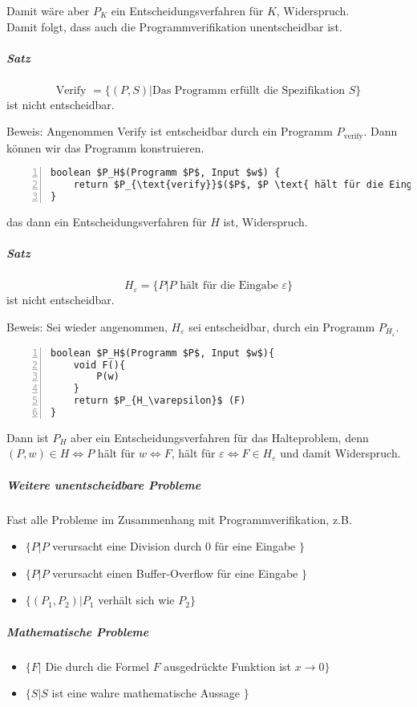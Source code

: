 \documentclass[a4paper]{scrartcl}
\begin{document}
Damit wäre aber $P_K$ ein Entscheidungsverfahren für $K$, Widerspruch.\\
Damit folgt, dass auch die Programmverifikation unentscheidbar ist.

\subparagraph{Satz} \[\text{Verify } = \{ (P,S) | \text{Das Programm erfüllt die Spezifikation } S \} \]
ist nicht entscheidbar.

Beweis: Angenommen Verify ist entscheidbar durch ein Programm $P_{\text{verify}}$. Dann können wir das Programm konstruieren.
\begin{lstlisting}[numbers=left, tabsize=4, style=customc,mathescape]
boolean $P_H$(Programm $P$, Input $w$) {
    return $P_{\text{verify}}$($P$, $P \text{ hält für die Eingabe } w$)
}
\end{lstlisting}
das dann ein Entscheidungsverfahren für $H$ ist, Widerspruch.

\subparagraph{Satz} \[H_\varepsilon = \{ P | P \text{ hält für die Eingabe } \varepsilon \}\] ist nicht entscheidbar.

Beweis: Sei wieder angenommen, $H_\varepsilon$ sei entscheidbar, durch ein Programm $P_{H_\varepsilon}$. 
\begin{lstlisting}[numbers=left, tabsize=4, style=customc,mathescape]
boolean $P_H$(Programm $P$, Input $w$){
    void F(){
        P(w)
    }
    return $P_{H_\varepsilon}$ (F)
}
\end{lstlisting}
Dann ist $P_H$ aber ein Entscheidungsverfahren für das Halteproblem, denn $(P,w) \in H  \Leftrightarrow P$ hält für $w \Leftrightarrow F$, hält für $\varepsilon \Leftrightarrow F \in H_\varepsilon$ und damit Widerspruch.

\subparagraph{Weitere unentscheidbare Probleme} Fast alle Probleme im Zusammenhang mit Programmverifikation, z.B.
\begin{itemize}
\item $\{ P |P$ verursacht eine Division durch $0$ für eine Eingabe $\}$
\item $\{P|P$ verursacht einen Buffer-Overflow für eine Eingabe $\}$
\item $\{ (P_1,P_2) |P_1$ verhält sich wie $P_2 \}$
\end{itemize}

\subparagraph{Mathematische Probleme}
\begin{itemize}
\item $\{F |$ Die durch die Formel $F$ ausgedrückte Funktion ist $x \to 0 \}$
\item $\{ S | S$ ist eine wahre mathematische Aussage $\}$
\end{itemize}
\end{document}
